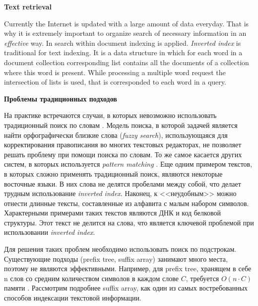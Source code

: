 
\textbf{Text retrieval}

Currently the Internet is updated with a large amount of data everyday.
That is why it is extremely important to organize search of necessary information in an \emph{effective} way.
In search within document indexing is applied.
\emph{Inverted index} is traditional for text indexing.
It is a data structure in which for each word in a document collection corresponding list
contains all the documents of a collection where this word is present.
While processing a multiple word request the intersection of lists is used,
that is corresponded to each word in a query.

\textbf{Проблемы традиционных подходов}

На практике встречаются случаи,
в которых невозможно использовать традиционный поиск по словам \cite{bast2013efficient}.
Модель поиска, в которой задачей является найти орфографически близкие слова (\emph{fuzzy search}),
использующаяся для корректирования правописания во многих текстовых редакторах,
не позволяет решать проблему при помощи поиска по словам.
То же самое касается других систем, в которых используется \emph{pattern matching} \cite{bai2018adaptive}.
Еще одним примером текстов, в которых сложно применять традиционный поиск,
являются некоторые восточные языки.
В них слова не делятся пробелами между собой, что делает трудным использование \emph{inverted index}.
Наконец, к <<неудобным>> можно отнести длинные тексты, составленные из алфавита с малым набором символов.
Характерными примерами таких текстов являются ДНК и код белковой структуры.
Этот текст не делится на слова, что является ключевой проблемой при использовании \emph{inverted index}.

Для решения таких проблем необходимо использовать поиск по подстрокам.
Существующие подходы (prefix tree, suffix array) занимают много места, поэтому не являются эффективными.
Например, для prefix tree, хранящем в себе n слов со средним количеством символов в каждом слове $C$,
требуется $O(n \cdot C)$ памяти \cite{aho1975efficient}.
Рассмотрим подробнее suffix array, как один из самых востребованных способов индексации текстовой информации.

